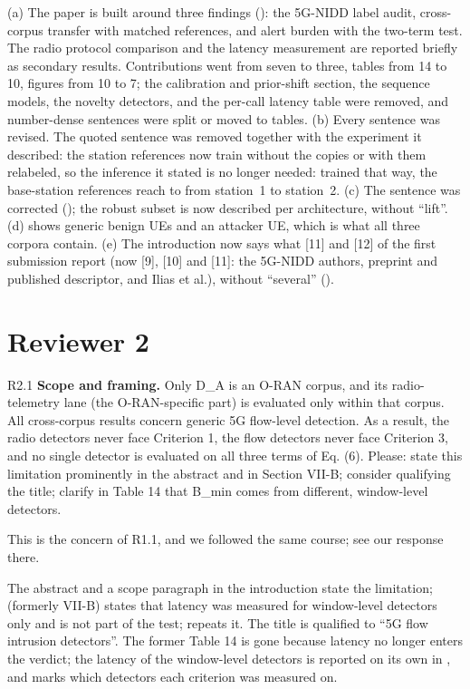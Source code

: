 \action
(a) The paper is built around three findings (): the 5G-NIDD label audit, cross-corpus transfer with matched references, and alert burden with the two-term test. The radio protocol comparison and the latency measurement are reported briefly as secondary results. Contributions went from seven to three, tables from 14 to 10, figures from 10 to 7; the calibration and prior-shift section, the sequence models, the novelty detectors, and the per-call latency table were removed, and number-dense sentences were split or moved to tables.
(b) Every sentence was revised. The quoted sentence was removed together with the experiment it described: the station references now train without the copies or with them relabeled, so the inference it stated is no longer needed: trained that way, the base-station references reach \RRefSoneCleanmin{} to \RRefSoneCleanmax{} from station~1 to station~2.
(c) The sentence was corrected (); the robust subset is now described per architecture, without ``lift''.
(d)  shows generic benign UEs and an attacker UE, which is what all three corpora contain.
(e) The introduction now says what [11] and [12] of the first submission report (now [9], [10] and [11]: the 5G-NIDD authors, preprint and published descriptor, and Ilias et al.), without ``several'' ().

\section*{Reviewer 2}

\label{rv:R2.1}
\begin{concern}{R2.1}
\textbf{Scope and framing.} Only D\_A is an O-RAN corpus, and its radio-telemetry lane (the O-RAN-specific part) is evaluated only within that corpus. All cross-corpus results concern generic 5G flow-level detection. As a result, the radio detectors never face Criterion 1, the flow detectors never face Criterion 3, and no single detector is evaluated on all three terms of Eq. (6). Please: state this limitation prominently in the abstract and in Section VII-B; consider qualifying the title; clarify in Table 14 that B\_min comes from different, window-level detectors.
\end{concern}
\response This is the concern of R1.1, and we followed the same course; see our response there.

\action The abstract and a scope paragraph in the introduction state the limitation;  (formerly VII-B) states that latency was measured for window-level detectors only and is not part of the test;  repeats it. The title is qualified to ``5G flow intrusion detectors''. The former Table 14 is gone because latency no longer enters the verdict; the latency of the window-level detectors is reported on its own in , and  marks which detectors each criterion was measured on.

